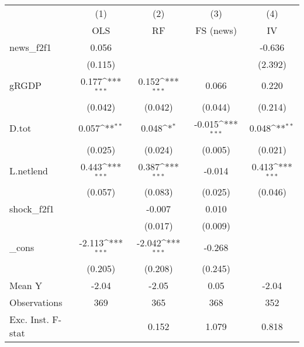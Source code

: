 {
\def\sym#1{\ifmmode^{#1}\else\(^{#1}\)\fi}
\begin{tabular}{l*{4}{c}}
\toprule
            &\multicolumn{1}{c}{(1)}&\multicolumn{1}{c}{(2)}&\multicolumn{1}{c}{(3)}&\multicolumn{1}{c}{(4)}\\
            &\multicolumn{1}{c}{OLS}&\multicolumn{1}{c}{RF}&\multicolumn{1}{c}{FS (news)}&\multicolumn{1}{c}{IV}\\
\midrule
news\_f2f1   &       0.056         &                     &                     &      -0.636         \\
            &     (0.115)         &                     &                     &     (2.392)         \\
\addlinespace
gRGDP       &       0.177\sym{***}&       0.152\sym{***}&       0.066         &       0.220         \\
            &     (0.042)         &     (0.042)         &     (0.044)         &     (0.214)         \\
\addlinespace
D.tot       &       0.057\sym{**} &       0.048\sym{*}  &      -0.015\sym{***}&       0.048\sym{**} \\
            &     (0.025)         &     (0.024)         &     (0.005)         &     (0.021)         \\
\addlinespace
L.netlend   &       0.443\sym{***}&       0.387\sym{***}&      -0.014         &       0.413\sym{***}\\
            &     (0.057)         &     (0.083)         &     (0.025)         &     (0.046)         \\
\addlinespace
shock\_f2f1  &                     &      -0.007         &       0.010         &                     \\
            &                     &     (0.017)         &     (0.009)         &                     \\
\addlinespace
\_cons      &      -2.113\sym{***}&      -2.042\sym{***}&      -0.268         &                     \\
            &     (0.205)         &     (0.208)         &     (0.245)         &                     \\
\midrule
Mean Y      &       -2.04         &       -2.05         &        0.05         &       -2.04         \\
Observations&         369         &         365         &         368         &         352         \\
Exc. Inst. F-stat&                     &       0.152         &       1.079         &       0.818         \\
\bottomrule
\end{tabular}
}
